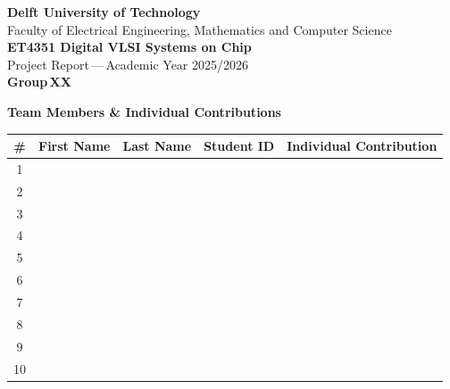 \documentclass[conference]{IEEEtran}
\begin{document}
\onecolumn
{}
\thispagestyle{empty}

\begin{center}
  \vspace*{0.5cm}
  {\Large\textbf{Delft University of Technology}}\\[0.15cm]
  {\normalsize Faculty of Electrical Engineering, Mathematics and Computer Science}\\[1.5cm]

  {\LARGE\textbf{ET4351 Digital VLSI Systems on Chip}}\\[0.15cm]
  {\Large Project Report\,---\,Academic Year 2025/2026}\\[2cm]

  {\Huge\textbf{Group\,\color{red}XX}}\\[1cm]
\end{center}

\vspace{0.6cm}

\noindent\textbf{\large Team Members \& Individual Contributions}

\vspace{2pt}

\noindent
{\small\renewcommand{\arraystretch}{0.95}
\begin{tabularx}{\textwidth}{|c|l|l|c|X|}
\hline
\rowcolor{lightgray}
\textbf{\#} & \textbf{First Name} & \textbf{Last Name} & \textbf{Student ID} & \textbf{Individual Contribution} \\
\hline
1  & & & & \\
\hline
2  & & & & \\
\hline
3  & & & & \\
\hline
4  & & & & \\
\hline
5  & & & & \\
\hline
6  & & & & \\
\hline
7  & & & & \\
\hline
8  & & & & \\
\hline
9  & & & & \\
\hline
10 & & & & \\
\hline
\end{tabularx}
}

\vspace{1pt}
\end{document}
